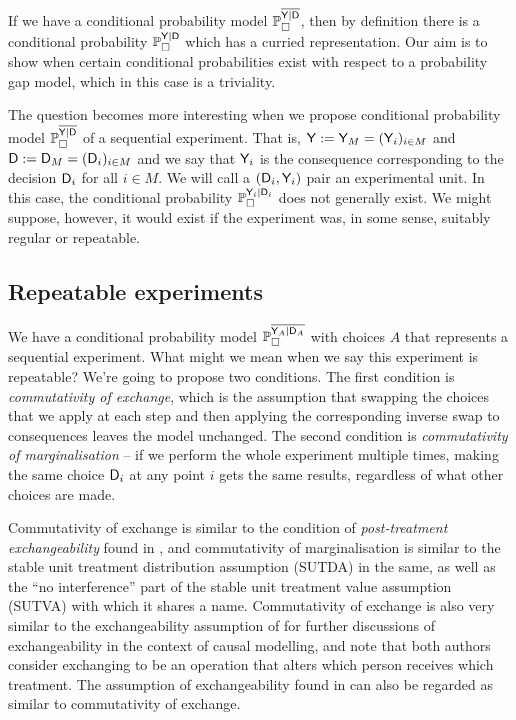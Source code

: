 If we have a conditional probability model $\mathbb{P}_\square^{\overline{\mathsf{Y}|\mathsf{D}}}$, then by definition there is a conditional probability $\mathbb{P}_\square^{\mathsf{Y}|\mathsf{D}}$ which has a curried representation. Our aim is to show when certain conditional probabilities exist with respect to a probability gap model, which in this case is a triviality.

The question becomes more interesting when we propose conditional probability model $\mathbb{P}_\square^{\overline{\mathsf{Y}|\mathsf{D}}}$ of a sequential experiment. That is, $\mathsf{Y}:=\mathsf{Y}_M=(\mathsf{Y}_i)_{i\in M}$ and $\mathsf{D}:=\mathsf{D}_M=(\mathsf{D}_i)_{i\in M}$ and we say that $\mathsf{Y}_i$ is the consequence corresponding to the decision $\mathsf{D}_i$ for all $i\in M$. We will call a $(\mathsf{D}_i,\mathsf{Y}_i)$ pair an experimental unit. In this case, the conditional probability $\mathbb{P}_\square^{\mathsf{Y}_i|\mathsf{D}_i}$ does not generally exist. We might suppose, however, it would exist if the experiment was, in some sense, suitably regular or repeatable.

\subsection{Repeatable experiments}

We have a conditional probability model $\mathbb{P}_\square^{\overline{\mathsf{Y}_A|\mathsf{D}_A}}$ with choices $A$ that represents a sequential experiment. What might we mean when we say this experiment is repeatable? We're going to propose two conditions. The first condition is \emph{commutativity of exchange}, which is the assumption that swapping the choices that we apply at each step and then applying the corresponding inverse swap to consequences leaves the model unchanged. The second condition is \emph{commutativity of marginalisation} -- if we perform the whole experiment multiple times, making the same choice $\mathsf{D}_i$ at any point $i$ gets the same results, regardless of what other choices are made.

Commutativity of exchange is similar to the condition of \emph{post-treatment exchangeability} found in \citet{dawid_decision-theoretic_2020}, and commutativity of marginalisation is similar to the stable unit treatment distribution assumption (SUTDA) in the same, as well as the ``no interference'' part of the stable unit treatment value assumption (SUTVA) with which it shares a name. Commutativity of exchange is also very similar to the exchangeability assumption of \citet{greenland_identifiability_1986} for further discussions of exchangeability in the context of causal modelling, and note that both authors consider exchanging to be an operation that alters which person receives which treatment. The assumption of exchangeability found in \citet{banerjee_chapter_2017} can also be regarded as similar to commutativity of exchange.

